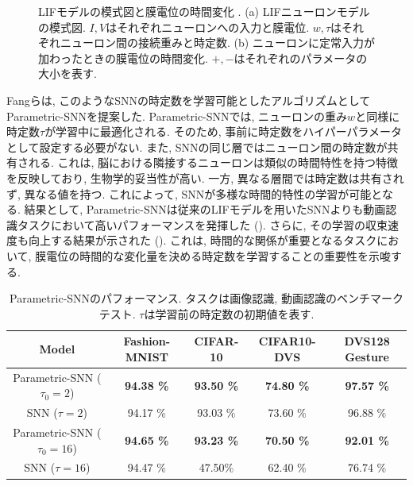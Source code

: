 \begin{figure}[htb]
{\begin{minipage}{0.657\textwidth}
            \label{fig:liffigure}
        \end{minipage}

        \caption[LIFモデルの模式図と膜電位の時間変化]{
            LIFモデルの模式図と膜電位の時間変化 \cite{paramsnn}.
            (a) LIFニューロンモデルの模式図. $I, V$はそれぞれニューロンへの入力と膜電位. 
            $w, \tau$はそれぞれニューロン間の接続重みと時定数. 
            (b) ニューロンに定常入力が加わったときの膜電位の時間変化. 
            $+, -$はそれぞれのパラメータの大小を表す.
        }
    }
\end{figure}

Fangらは, このようなSNNの時定数を学習可能としたアルゴリズムとしてParametric-SNNを提案した\cite{paramsnn}.
Parametric-SNNでは, ニューロンの重み$w$と同様に時定数$\tau$が学習中に最適化される.
そのため, 事前に時定数をハイパーパラメータとして設定する必要がない.
また, SNNの同じ層ではニューロン間の時定数が共有される.
これは, 脳における隣接するニューロンは類似の時間特性を持つ特徴を反映しており, 生物学的妥当性が高い.
一方, 異なる層間では時定数は共有されず, 異なる値を持つ.
これによって, SNNが多様な時間的特性の学習が可能となる.
結果として, Parametric-SNNは従来のLIFモデルを用いたSNNよりも動画認識タスクにおいて高いパフォーマンスを発揮した ().
さらに, その学習の収束速度も向上する結果が示された ().
これは, 時間的な関係が重要となるタスクにおいて, 膜電位の時間的な変化量を決める時定数を学習することの重要性を示唆する.
\begin{table}[htb]
    \centering
    \caption[Parametric-SNNのパフォーマンス]{
        Parametric-SNNのパフォーマンス\cite{paramsnn}.
        タスクは画像認識, 動画認識のベンチマークテスト. 
        $\tau$は学習前の時定数の初期値を表す.
    }
    \label{tab:paramsnn:result1}
    {\small %
    \begin{tabular}{ccccc}
        \hline
        Model & Fashion-MNIST & CIFAR-10 & CIFAR10-DVS & DVS128 Gesture\\
        \hline
        Parametric-SNN ($\tau_0=2$) & \textbf{94.38 \%} & \textbf{93.50 \%} & \textbf{74.80 \%} & \textbf{97.57 \%}\\
        SNN ($\tau=2$) & 94.17 \% & 93.03 \% & 73.60 \% & 96.88 \%\\
        \hline
        Parametric-SNN ($\tau_0=16$) & \textbf{94.65 \%} & \textbf{93.23 \%} & \textbf{70.50 \%} & \textbf{92.01 \%}\\
        SNN ($\tau=16$) & 94.47 \% & 47.50\% & 62.40 \% & 76.74 \%\\
        \hline
    \end{tabular}
    }
\end{table}

